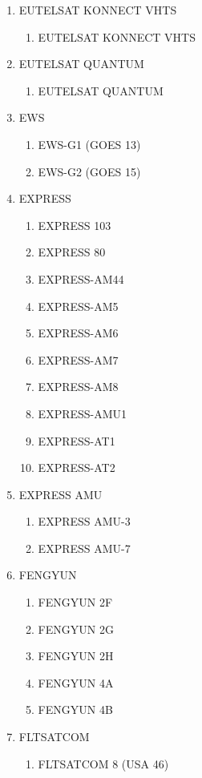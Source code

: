 \begin{multicols}{2}
\begin{enumerate}
  \item EUTELSAT KONNECT VHTS
  \begin{enumerate}
    \item EUTELSAT KONNECT VHTS
  \end{enumerate}
  \item EUTELSAT QUANTUM
  \begin{enumerate}
    \item EUTELSAT QUANTUM
  \end{enumerate}
  \item EWS
  \begin{enumerate}
    \item EWS-G1 (GOES 13)
    \item EWS-G2 (GOES 15)
  \end{enumerate}
  \item EXPRESS
  \begin{enumerate}
    \item EXPRESS 103
    \item EXPRESS 80
    \item EXPRESS-AM44
    \item EXPRESS-AM5
    \item EXPRESS-AM6
    \item EXPRESS-AM7
    \item EXPRESS-AM8
    \item EXPRESS-AMU1
    \item EXPRESS-AT1
    \item EXPRESS-AT2
  \end{enumerate}
  \item EXPRESS AMU
  \begin{enumerate}
    \item EXPRESS AMU-3
    \item EXPRESS AMU-7
  \end{enumerate}
  \item FENGYUN
  \begin{enumerate}
    \item FENGYUN 2F
    \item FENGYUN 2G
    \item FENGYUN 2H
    \item FENGYUN 4A
    \item FENGYUN 4B
  \end{enumerate}
  \item FLTSATCOM
  \begin{enumerate}
    \item FLTSATCOM 8 (USA 46)
  \end{enumerate}

\end{enumerate}
\end{multicols}
